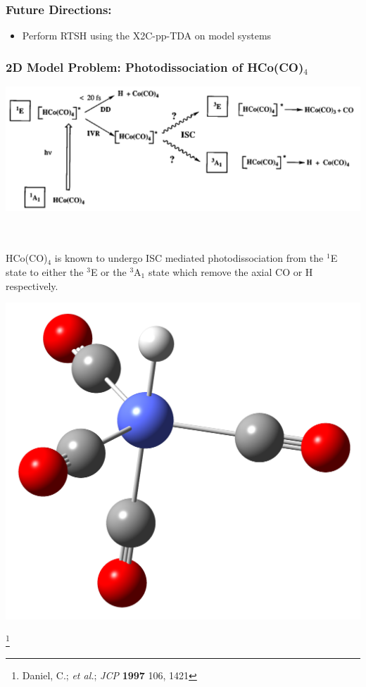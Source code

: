 \documentclass[usepdftitle=false,10pt]{beamer}
\newcommand\blfootnote[1]{%
  \begingroup
  \renewcommand\thefootnote{}\footnote{#1}%
  \addtocounter{footnote}{-1}%
  \endgroup
}
\begin{document}
\begin{frame}
  \frametitle{Future Directions:}
  \begin{itemize}
    \item[\ding{228}] Perform RTSH using the X2C-pp-TDA on model systems
  \end{itemize}
  \vfill
\end{frame}
\begin{frame}
  \frametitle{2D Model Problem: Photodissociation of HCo(CO)$_4$}
  \begin{minipage}{0.49\textwidth}
    \includegraphics[width=\textwidth]{Photodiss}

    ~\\~\\
    HCo(CO)$_4$ is known to undergo ISC mediated photodissociation from the 
    $^1$E state to either the $^3$E or the $^3$A$_1$ state which remove the
    axial CO or H respectively.
  \end{minipage}
  \begin{minipage}{0.5\textwidth}
    \includegraphics[width=\textwidth]{HCoCO4}
  \end{minipage}

  \blfootnote{\tiny Daniel, C.; \emph{et al.}; \emph{JCP} \textbf{1997} 106, 1421}
\end{frame}
\end{document}
